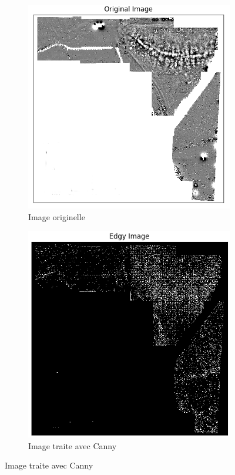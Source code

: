 \documentclass[a4paper, 12pt, titlepage, oneside]{article}
\begin{document}
	\begin{figure}[!h]
		\centering
		\begin{subfigure}[b]{0.4\linewidth}
			\includegraphics[width=\linewidth]{Canny1a.png}
			\caption{Image originelle}
		\end{subfigure}
		\begin{subfigure}[b]{0.4\linewidth}
			\includegraphics[width=\linewidth]{Canny1b.png}
			\caption{Image traite avec Canny}
		\end{subfigure}
		\label{fig:canny}
	\end{figure}
	
\end{document}
